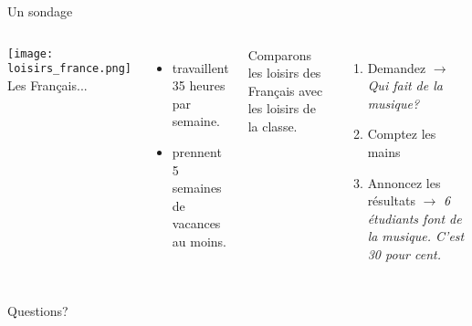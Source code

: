 \documentclass{beamer}
\begin{document}
  \begin{frame}{Un sondage}
    \begin{columns}
        \texttt{[image: loisirs\_france.png]} \\
        Les Français...
        \begin{itemize}
          \item travaillent 35 heures par semaine.
          \item prennent 5 semaines de vacances au moins.
        \end{itemize}
        Comparons les loisirs des Français avec les loisirs de la classe. \\
        \begin{enumerate}
          \item Demandez $\to$ \emph{Qui fait de la musique?}
          \item Comptez les mains
          \item Annoncez les résultats $\to$ \emph{6 étudiants font de la musique. C'est 30 pour cent.}
        \end{enumerate}
    \end{columns}
  \end{frame}

  \begin{frame}{}
    \begin{center}
      \Large Questions?
    \end{center}
  \end{frame}
\end{document}
